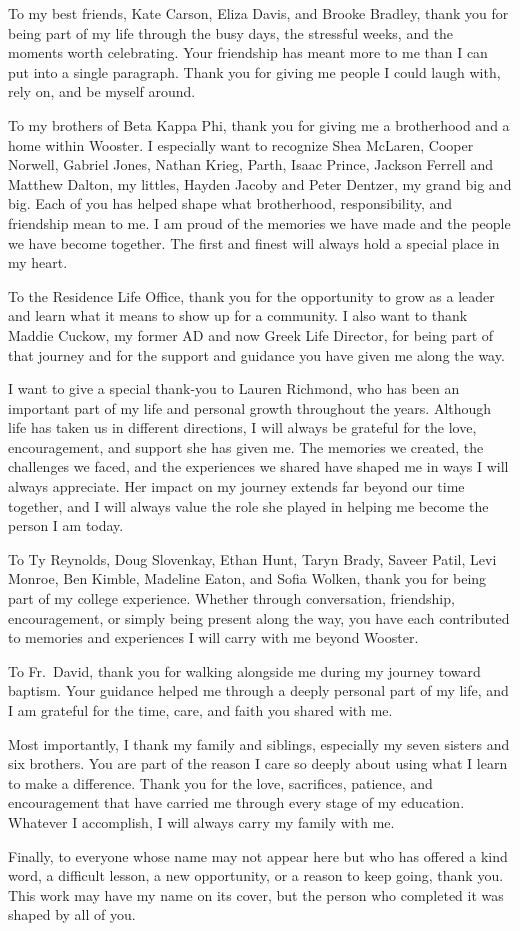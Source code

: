 \documentclass[palatino,code,picins,tikz,kaukecopyright,openright,lshortwooster,dropcaps,verbatim,index,oneside,euler,final]{woosterthesis}
\begin{document}
\begin{acknowl}
To my best friends, Kate Carson, Eliza Davis, and Brooke Bradley, thank you for being part of my life through the busy days, the stressful weeks, and the moments worth celebrating. Your friendship has meant more to me than I can put into a single paragraph. Thank you for giving me people I could laugh with, rely on, and be myself around.

To my brothers of Beta Kappa Phi, thank you for giving me a brotherhood and a home within Wooster. I especially want to recognize Shea McLaren, Cooper Norwell, Gabriel Jones, Nathan Krieg, Parth, Isaac Prince, Jackson Ferrell and Matthew Dalton, my littles, Hayden Jacoby and Peter Dentzer, my grand big and big. Each of you has helped shape what brotherhood, responsibility, and friendship mean to me. I am proud of the memories we have made and the people we have become together. The first and finest will always hold a special place in my heart.

To the Residence Life Office, thank you for the opportunity to grow as a leader and learn what it means to show up for a community. I also want to thank Maddie Cuckow, my former AD and now Greek Life Director, for being part of that journey and for the support and guidance you have given me along the way.

I want to give a special thank-you to Lauren Richmond, who has been an important part of my life and personal growth throughout the years. Although life has taken us in different directions, I will always be grateful for the love, encouragement, and support she has given me. The memories we created, the challenges we faced, and the experiences we shared have shaped me in ways I will always appreciate. Her impact on my journey extends far beyond our time together, and I will always value the role she played in helping me become the person I am today.

To Ty Reynolds, Doug Slovenkay, Ethan Hunt, Taryn Brady, Saveer Patil, Levi Monroe, Ben Kimble, Madeline Eaton, and Sofia Wolken, thank you for being part of my college experience. Whether through conversation, friendship, encouragement, or simply being present along the way, you have each contributed to memories and experiences I will carry with me beyond Wooster.

To Fr.~David, thank you for walking alongside me during my journey toward baptism. Your guidance helped me through a deeply personal part of my life, and I am grateful for the time, care, and faith you shared with me.

Most importantly, I thank my family and siblings, especially my seven sisters and six brothers. You are part of the reason I care so deeply about using what I learn to make a difference. Thank you for the love, sacrifices, patience, and encouragement that have carried me through every stage of my education. Whatever I accomplish, I will always carry my family with me.

Finally, to everyone whose name may not appear here but who has offered a kind word, a difficult lesson, a new opportunity, or a reason to keep going, thank you. This work may have my name on its cover, but the person who completed it was shaped by all of you.
\end{acknowl}
\end{document}
